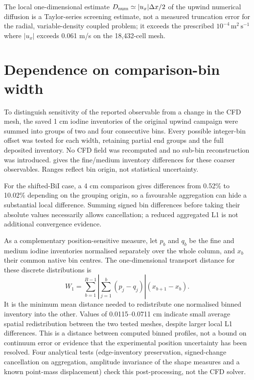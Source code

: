 \documentclass{article}
\newcommand{\units}[1]{\,\mathrm{#1}}
\begin{document}
The local one-dimensional estimate $D_{\rm num}\simeq|u_x|\Delta x/2$
of the upwind numerical diffusion is a Taylor-series screening
estimate, not a measured truncation error for the radial,
variable-density coupled problem; it exceeds the prescribed
$10^{-4}\units{m^2\,s^{-1}}$ where $|u_x|$ exceeds 0.061 m/s on the
18,432-cell mesh.

\section{Dependence on comparison-bin width}
\label{sec:s-bins}
To distinguish sensitivity of the reported observable from a change in
the CFD mesh, the saved 1 cm iodine inventories of the original upwind
campaign were summed into groups of two and four consecutive bins.
Every possible integer-bin offset was tested for each width, retaining
partial end groups and the full deposited inventory. No CFD field was
recomputed and no sub-bin reconstruction was introduced.
 gives the fine/medium inventory differences for
these coarser observables. Ranges reflect bin origin, not statistical
uncertainty.
\begin{table}[htbp]
\centering
\caption{Original upwind fine/medium iodine inventory-profile
differences (percent, 41,472 versus 18,432 cells) after aggregation of
native bins. The 2 and 4 cm ranges cover all respective integer-bin
offsets. $W_1$ uses the original 1 cm bin centres and separately
normalised profiles; it measures redistribution distance, not position
error against the experiment.}
\label{tab:bin-audit}
\small
\end{table}

For the shifted-BiI case, a 4 cm comparison gives differences from
0.52\% to 10.02\% depending on the grouping origin, so a favourable
aggregation can hide a substantial local difference. Summing signed
bin differences before taking their absolute values necessarily allows
cancellation; a reduced aggregated L1 is not additional convergence
evidence.

As a complementary position-sensitive measure, let $p_b$ and $q_b$ be
the fine and medium iodine inventories normalised separately over the
whole column, and $x_b$ their common native bin centres. The
one-dimensional transport distance for these discrete distributions is
\begin{equation}
 W_1=\sum_{b=1}^{B-1}\left|\sum_{j=1}^{b}(p_j-q_j)\right|
                  (x_{b+1}-x_b).
 \label{eq:binned-wasserstein}
\end{equation}
It is the minimum mean distance needed to redistribute one normalised
binned inventory into the other. Values of 0.0115--0.0711 cm indicate
small average spatial redistribution between the two tested meshes,
despite larger local L1 differences. This is a distance between
computed binned profiles, not a bound on continuum error or evidence
that the experimental position uncertainty has been resolved. Four
analytical tests (edge-inventory preservation, signed-change
cancellation on aggregation, amplitude invariance of the shape measures
and a known point-mass displacement) check this post-processing, not
the CFD solver.
\end{document}
